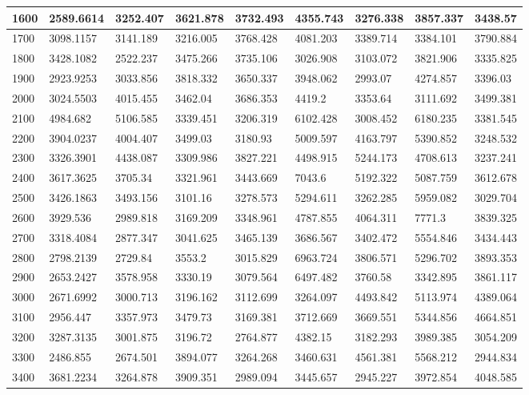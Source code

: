 \documentclass [11pt, proquest] {uwthesis}[2020/12/20]
\begin{document}
\begin{table}[]
\begin{tiny}
\begin{tabular}{|l|l|l|l|l|l|l|l|l|}
1600 & 2589.6614 & 3252.407 & 3621.878 & 3732.493 & 4355.743 & 3276.338 & 3857.337 & 3438.57 \\ \hline
1700 & 3098.1157 & 3141.189 & 3216.005 & 3768.428 & 4081.203 & 3389.714 & 3384.101 & 3790.884 \\ \hline
1800 & 3428.1082 & 2522.237 & 3475.266 & 3735.106 & 3026.908 & 3103.072 & 3821.906 & 3335.825 \\ \hline
1900 & 2923.9253 & 3033.856 & 3818.332 & 3650.337 & 3948.062 & 2993.07 & 4274.857 & 3396.03 \\ \hline
2000 & 3024.5503 & 4015.455 & 3462.04 & 3686.353 & 4419.2 & 3353.64 & 3111.692 & 3499.381 \\ \hline
2100 & 4984.682 & 5106.585 & 3339.451 & 3206.319 & 6102.428 & 3008.452 & 6180.235 & 3381.545 \\ \hline
2200 & 3904.0237 & 4004.407 & 3499.03 & 3180.93 & 5009.597 & 4163.797 & 5390.852 & 3248.532 \\ \hline
2300 & 3326.3901 & 4438.087 & 3309.986 & 3827.221 & 4498.915 & 5244.173 & 4708.613 & 3237.241 \\ \hline
2400 & 3617.3625 & 3705.34 & 3321.961 & 3443.669 & 7043.6 & 5192.322 & 5087.759 & 3612.678 \\ \hline
2500 & 3426.1863 & 3493.156 & 3101.16 & 3278.573 & 5294.611 & 3262.285 & 5959.082 & 3029.704 \\ \hline
2600 & 3929.536 & 2989.818 & 3169.209 & 3348.961 & 4787.855 & 4064.311 & 7771.3 & 3839.325 \\ \hline
2700 & 3318.4084 & 2877.347 & 3041.625 & 3465.139 & 3686.567 & 3402.472 & 5554.846 & 3434.443 \\ \hline
2800 & 2798.2139 & 2729.84 & 3553.2 & 3015.829 & 6963.724 & 3806.571 & 5296.702 & 3893.353 \\ \hline
2900 & 2653.2427 & 3578.958 & 3330.19 & 3079.564 & 6497.482 & 3760.58 & 3342.895 & 3861.117 \\ \hline
3000 & 2671.6992 & 3000.713 & 3196.162 & 3112.699 & 3264.097 & 4493.842 & 5113.974 & 4389.064 \\ \hline
3100 & 2956.447 & 3357.973 & 3479.73 & 3169.381 & 3712.669 & 3669.551 & 5344.856 & 4664.851 \\ \hline
3200 & 3287.3135 & 3001.875 & 3196.72 & 2764.877 & 4382.15 & 3182.293 & 3989.385 & 3054.209 \\ \hline
3300 & 2486.855 & 2674.501 & 3894.077 & 3264.268 & 3460.631 & 4561.381 & 5568.212 & 2944.834 \\ \hline
3400 & 3681.2234 & 3264.878 & 3909.351 & 2989.094 & 3445.657 & 2945.227 & 3972.854 & 4048.585 \\ \hline

\end{tabular}
\end{tiny}
\end{table}
\end{document}
